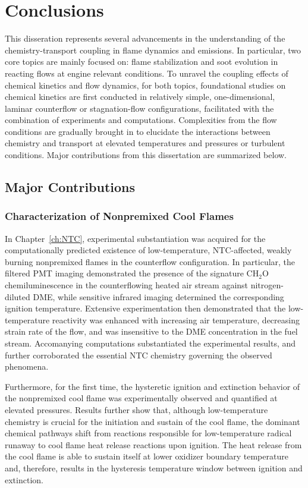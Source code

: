 \chapter{Conclusions}\label{ch:conclusions}

This disseration represents several advancements in the understanding of the chemistry-transport coupling in flame dynamics and emissions.  In particular, two core topics are mainly focused on: flame stabilization and soot evolution in reacting flows at engine relevant conditions.  To unravel the coupling effects of chemical kinetics and flow dynamics, for both topics, foundational studies on chemical kinetics are first conducted in relatively simple, one-dimensional, laminar counterflow or stagnation-flow configurations, facilitated with the combination of experiments and computations.  Complexities from the flow conditions are gradually brought in to elucidate the interactions between chemistry and transport at elevated temperatures and pressures or turbulent conditions.  Major contributions from this dissertation are summarized below.

\section{Major Contributions}

\subsection{Characterization of Nonpremixed Cool Flames}

In Chapter~\ref{ch:NTC}, experimental substantiation was acquired for the computationally predicted existence of low-temperature, NTC-affected, weakly burning nonpremixed flames in the counterflow configuration.  In particular, the filtered PMT imaging demonstrated the presence of the signature CH$_2$O chemiluminescence in the counterflowing heated air stream against nitrogen-diluted DME, while sensitive infrared imaging determined the corresponding ignition temperature.  Extensive experimentation then demonstrated that the low-temperature reactivity was enhanced with increasing air temperature, decreasing strain rate of the flow, and was insensitive to the DME concentration in the fuel stream.  Accomanying computations substantiated the experimental results, and further corroborated the essential NTC chemistry governing the observed phenomena.

Furthermore, for the first time, the hysteretic ignition and extinction behavior of the nonpremixed cool flame was experimentally observed and quantified at elevated pressures.  Results further show that, although low-temperature chemistry is crucial for the initiation and sustain of the cool flame, the dominant chemical pathways shift from reactions responsible for low-temperature radical runaway to cool flame heat release reactions upon ignition.  The heat release from the cool flame is able to sustain itself at lower oxidizer boundary temperature and, therefore, results in the hysteresis temperature window between ignition and extinction.

